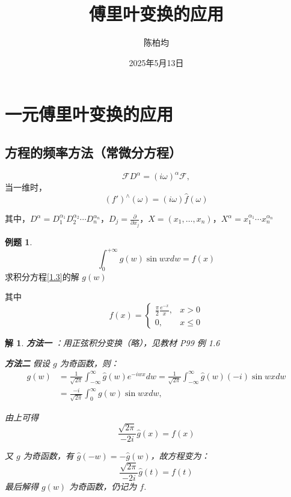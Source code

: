 \documentclass[12pt,a4paper]{article}
\title{傅里叶变换的应用}
\author{陈柏均}
\date{2025年5月13日}
\numberwithin{subsection}{section}   %
\numberwithin{subsubsection}{subsection}
\theoremstyle{plain}
\newtheorem{solution}{解}[subsection]  %
\theoremstyle{definition}
\newtheorem{example}{例题}[subsection]  %
\theoremstyle{remark}
\theoremstyle{remark}
\begin{document}
	\maketitle

\section{一元傅里叶变换的应用}

\subsection{方程的频率方法（常微分方程）}
\begin{equation}
	\mathcal{F} D^\alpha = (i \omega)^\alpha \mathcal{F}, 
\end{equation}
	当一维时，
\begin{equation}
 (f')^\wedge(\omega) = (i \omega) \hat{f}(\omega) 
\end{equation}

其中，\(D^\alpha = D_1^{\alpha_1} D_2^{\alpha_2} \cdots D_n^{\alpha_n}\)，\(D_j = \frac{\partial}{\partial x_j}\)，\(X = (x_1, \ldots, x_n)\)，\(X^\alpha = x_1^{\alpha_1} \cdots x_n^{\alpha_n}\)

\begin{example}
	
		\begin{equation}\label{1.3}
	\int_0^{+\infty} g(w) \sin w x dw = f(x)
		\end{equation}
	求积分方程\eqref{1.3}的解 \(g(w)\)
	
	其中
	\begin{equation}
		f(x) = 
		\begin{cases} 
			\frac{\pi}{2} \frac{e^{-x}}{x}, & x > 0 \\[8pt]
						0, & x \leq 0
		\end{cases}
	\end{equation}
\end{example}

\begin{solution}
\textbf{方法一}	：用正弦积分变换（略），见教材 P99 例 1.6

\textbf{方法二}
		假设 \(g\) 为奇函数，则：
	\begin{equation}
		\begin{aligned}
			g(w) &= \frac{1}{\sqrt{2 \pi}} \int_{-\infty}^{\infty} \hat{g}(w) e^{-i w x} dw = \frac{1}{\sqrt{2 \pi}} \int_{-\infty}^{\infty} \hat{g}(w) (-i) \sin w x dw \\[8pt]
			&= \frac{-i}{\sqrt{2 \pi}} \int_0^{\infty} g(w) \sin w x dw,
		\end{aligned}
	\end{equation}
		
		由上可得
		\begin{equation}
 \frac{\sqrt{2 \pi}}{-2 i} \hat{g}(x) = f(x)
\end{equation}

 又 \(g\) 为奇函数，有 \(\hat{g}(-w) = -\hat{g}(w)\)，故方程变为：
	\begin{equation}\label{1.6}
		\frac{\sqrt{2 \pi}}{-2 i} \hat{g}(t) = f(t)
	\end{equation}
	最后解得 \(g(w)\) 为奇函数，仍记为 \(f\).
\end{solution}
\end{document}

